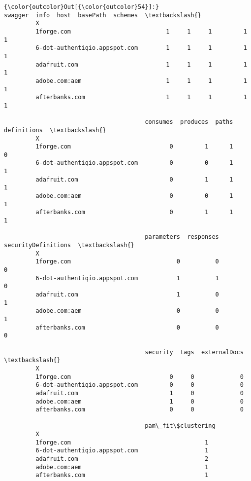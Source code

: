 \documentclass[11pt]{article}
\begin{document}
\begin{Verbatim}[commandchars=\\\{\}]
{\color{outcolor}Out[{\color{outcolor}54}]:}                                swagger  info  host  basePath  schemes  \textbackslash{}
         X                                                                       
         1forge.com                           1     1     1         1        1   
         6-dot-authentiqio.appspot.com        1     1     1         1        1   
         adafruit.com                         1     1     1         1        1   
         adobe.com:aem                        1     1     1         1        1   
         afterbanks.com                       1     1     1         1        1   
         
                                        consumes  produces  paths  definitions  \textbackslash{}
         X                                                                       
         1forge.com                            0         1      1            0   
         6-dot-authentiqio.appspot.com         0         0      1            1   
         adafruit.com                          0         1      1            1   
         adobe.com:aem                         0         0      1            1   
         afterbanks.com                        0         1      1            1   
         
                                        parameters  responses  securityDefinitions  \textbackslash{}
         X                                                                           
         1forge.com                              0          0                    0   
         6-dot-authentiqio.appspot.com           1          1                    0   
         adafruit.com                            1          0                    1   
         adobe.com:aem                           0          0                    1   
         afterbanks.com                          0          0                    0   
         
                                        security  tags  externalDocs  \textbackslash{}
         X                                                             
         1forge.com                            0     0             0   
         6-dot-authentiqio.appspot.com         0     0             0   
         adafruit.com                          1     0             0   
         adobe.com:aem                         1     0             0   
         afterbanks.com                        0     0             0   
         
                                        pam\_fit\$clustering  
         X                                                  
         1forge.com                                      1  
         6-dot-authentiqio.appspot.com                   1  
         adafruit.com                                    2  
         adobe.com:aem                                   1  
         afterbanks.com                                  1  
\end{Verbatim}
            
\end{document}
